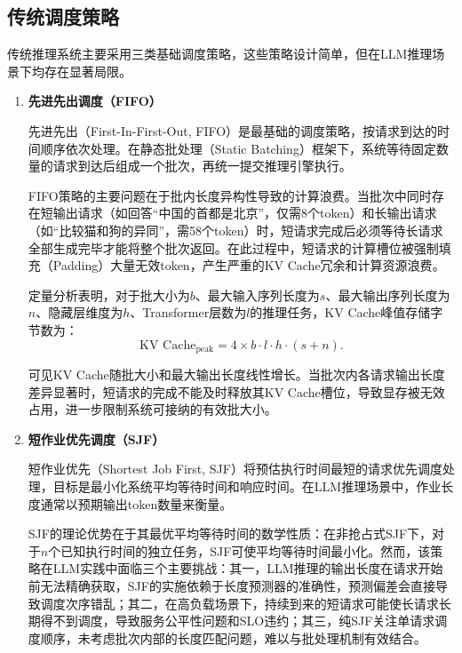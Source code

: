 \subsection{传统调度策略}

传统推理系统主要采用三类基础调度策略，这些策略设计简单，但在LLM推理场景下均存在显著局限。

\begin{enumerate}
    
\item \textbf{先进先出调度（FIFO）}

先进先出（First-In-First-Out, FIFO）是最基础的调度策略，按请求到达的时间顺序依次处理。在静态批处理（Static Batching）框架下，系统等待固定数量的请求到达后组成一个批次，再统一提交推理引擎执行。

FIFO策略的主要问题在于批内长度异构性导致的计算浪费。当批次中同时存在短输出请求（如回答“中国的首都是北京”，仅需8个token）和长输出请求（如“比较猫和狗的异同”，需58个token）时，短请求完成后必须等待长请求全部生成完毕才能将整个批次返回。在此过程中，短请求的计算槽位被强制填充（Padding）大量无效token，产生严重的KV Cache冗余和计算资源浪费\cite{he2024uellm,hong2024flashdecoding++}。

定量分析表明，对于批大小为$b$、最大输入序列长度为$s$、最大输出序列长度为$n$、隐藏层维度为$h$、Transformer层数为$l$的推理任务，KV Cache峰值存储字节数为：
\begin{equation}
  \text{KV Cache}_{\text{peak}} = 4 \times b \cdot l \cdot h \cdot (s + n).
  \label{eq:kvcache_peak}
\end{equation}

可见KV Cache随批大小和最大输出长度线性增长\cite{sheng2023flexgen}。当批次内各请求输出长度差异显著时，短请求的完成不能及时释放其KV Cache槽位，导致显存被无效占用，进一步限制系统可接纳的有效批大小。

\item \textbf{短作业优先调度（SJF）}

短作业优先（Shortest Job First, SJF）将预估执行时间最短的请求优先调度处理，目标是最小化系统平均等待时间和响应时间。在LLM推理场景中，作业长度通常以预期输出token数量来衡量\cite{zhu2021perph}。

SJF的理论优势在于其最优平均等待时间的数学性质：在非抢占式SJF下，对于$n$个已知执行时间的独立任务，SJF可使平均等待时间最小化。然而，该策略在LLM实践中面临三个主要挑战：其一，LLM推理的输出长度在请求开始前无法精确获取，SJF的实施依赖于长度预测器的准确性，预测偏差会直接导致调度次序错乱；其二，在高负载场景下，持续到来的短请求可能使长请求长期得不到调度，导致服务公平性问题和SLO违约；其三，纯SJF关注单请求调度顺序，未考虑批次内部的长度匹配问题，难以与批处理机制有效结合。


\end{enumerate}
